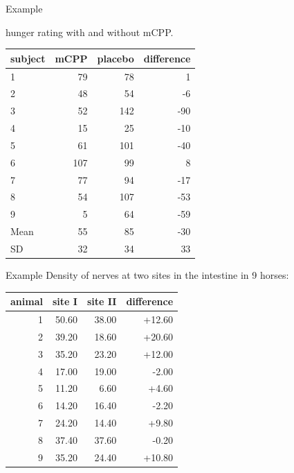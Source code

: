 \begin{frame}{Example}

     hunger rating with and without mCPP.
    \begin{center}
      \begin{tabular}{lrrr}
        \hline
        subject & mCPP & placebo & difference \\ 
        \hline
        1 & 79 & 78 & 1 \\ 
        2 & 48 & 54 & -6 \\ 
        3 & 52 & 142 & -90 \\ 
        4 & 15 & 25 & -10 \\ 
        5 & 61 & 101 & -40 \\ 
        6 & 107 & 99 & 8 \\ 
        7 & 77 & 94 & -17 \\ 
        8 & 54 & 107 & -53 \\ 
        9 & 5 & 64 & -59 \\ 
        \hline
         Mean & 55 & 85 & -30 \\ 
         SD & 32 & 34 & 33 \\ 
         \hline
      \end{tabular}
    \end{center}
\end{frame}

\begin{frame}{Example}
    Density of nerves at two sites in the intestine in 9 horses:
    \begin{center}
\begin{tabular}{rrrr}
  \hline
 animal & site I & site II & difference \\ 
  \hline
  1 &  50.60 & 38.00 & +12.60 \\ 
  2 &  39.20 & 18.60 & +20.60 \\ 
  3 &  35.20 & 23.20 & +12.00 \\ 
  4 &  17.00 & 19.00 & -2.00 \\ 
  5 &  11.20 & 6.60 & +4.60 \\ 
  6 &  14.20 & 16.40 & -2.20 \\ 
  7 &  24.20 & 14.40 & +9.80 \\ 
  8 &  37.40 & 37.60 & -0.20 \\ 
  9 &  35.20 & 24.40 & +10.80 \\ 
   \hline
\end{tabular}
    \end{center}

\end{frame}


